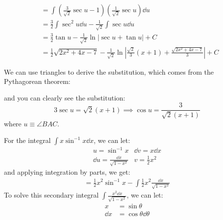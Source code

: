 \begin{itemize}
\begin{example}
\begin{align}
            &= \int \left(\frac{3}{\sqrt{2}}\sec u -1\right)\left(\frac{1}{\sqrt{2}}\sec u\right) \dd{u} \\ 
            &= \frac{3}{2}\int \sec^2 u \dd{u} - \frac{1}{\sqrt{2}}\int \sec u \dd{u} \\ 
            &= \frac{3}{2}\tan u - \frac{1}{\sqrt{2}}\ln|\sec u + \tan u| + C \\
            &= \frac{1}{2}\sqrt{2x^2+4x-7} - \frac{1}{\sqrt{2}}\ln\left|\frac{\sqrt{2}}{3}(x+1)+\frac{\sqrt{2x^2+4x-7}}{3}\right| + C
        \end{align}
    \end{example}
    \begin{idea}
        We can use triangles to derive the substitution, which comes from the Pythagorean theorem:
        \begin{center}
        \end{center}
        and you can clearly see the substitution:
        \begin{equation}
            3\sec u = \sqrt{2}(x+1) \implies \cos u = \frac{3}{\sqrt{2} (x+1)}
        \end{equation}
        where $u \equiv \angle BAC$.
    \end{idea}
    \begin{example}
        For the integral $\int x \sin^{-1} x \dd{x}$, we can let:
        \begin{align}
            u = \sin^{-1} x & \dd{v} = x \dd{x} \\
            \dd{u} = \frac{\dd{x}}{\sqrt{1-x^2}} & v = \frac{1}{2}x^2 
        \end{align}
        and applying integration by parts, we get:
        \begin{align}
            =\frac{1}{2}x^2 \sin^{-1} x - \int \frac{1}{2}x^2 \frac{\dd{x}}{\sqrt{1-x^2}}
        \end{align}
        To solve this secondary integral $\int \frac{x^2 \dd{x}}{\sqrt{1-x^2}}$, we can let:
        \begin{align}
            x &= \sin\theta \\ 
            \dd{x} &= \cos \theta \dd{\theta} \\ 

\end{align}
\end{example}
\end{itemize}

